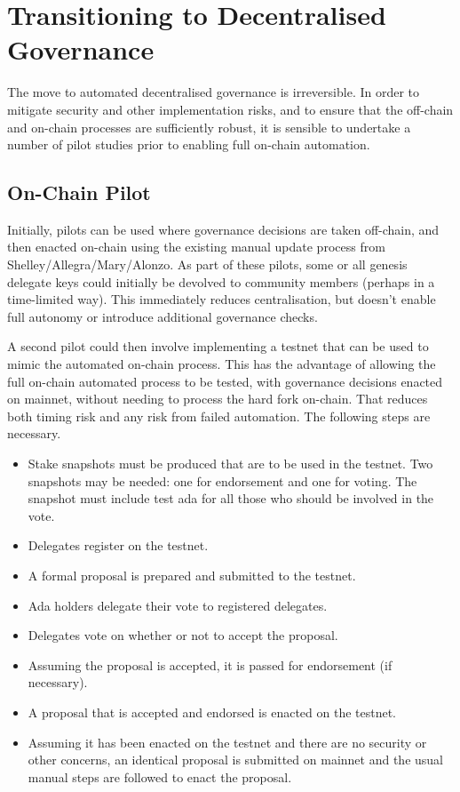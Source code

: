 \section{Transitioning to Decentralised Governance}
\label{sect:transition}

The move to automated decentralised governance is irreversible.  In order to mitigate security and other implementation risks, and to ensure that the off-chain and on-chain
processes are sufficiently robust, it is sensible to undertake a number of pilot studies prior to enabling full on-chain automation.

\subsection{On-Chain Pilot}

Initially, pilots can be used where governance decisions are taken off-chain, and then enacted on-chain using the existing manual update process from Shelley/Allegra/Mary/Alonzo.
As part of these pilots, some or all genesis delegate keys could initially be devolved to community members (perhaps in a time-limited way).  This immediately reduces centralisation,
but doesn't enable full autonomy or introduce additional governance checks.

A second pilot could then involve implementing a testnet that can be used to mimic the automated on-chain process.  This has the advantage of allowing the full on-chain automated
process to be tested, with governance decisions enacted on mainnet, without needing to process the hard fork on-chain.  That reduces both timing risk and any risk from failed automation.
The following steps are necessary.

\begin{itemize}
\item
  Stake snapshots must be produced that are to be used in the testnet.  Two snapshots may be needed: one for endorsement and one for voting.  The snapshot must include
  test ada for all those who should be involved in the vote.
\item
  Delegates register on the testnet.
\item
  A formal proposal is prepared and submitted to the testnet.
\item
  Ada holders delegate their vote to registered delegates.
\item
  Delegates vote on whether or not to accept the proposal.
\item
  Assuming the proposal is accepted, it is passed for endorsement (if necessary).
\item
  A proposal that is accepted and endorsed is enacted on the testnet.
\item
  Assuming it has been enacted on the testnet and there are no security or other concerns, an identical proposal is submitted on mainnet and the usual manual steps are
  followed to enact the proposal.
\end{itemize}

